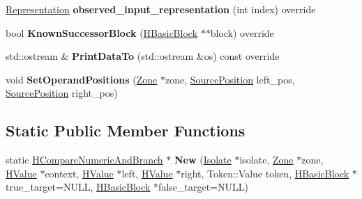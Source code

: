 \begin{DoxyCompactItemize}
\item 
\hyperlink{classv8_1_1internal_1_1_representation}{Representation} {\bfseries observed\+\_\+input\+\_\+representation} (int index) override\hypertarget{classv8_1_1internal_1_1_h_compare_numeric_and_branch_a8b893e5a1b233e9f026cb100224024e4}{}\label{classv8_1_1internal_1_1_h_compare_numeric_and_branch_a8b893e5a1b233e9f026cb100224024e4}

\item 
bool {\bfseries Known\+Successor\+Block} (\hyperlink{classv8_1_1internal_1_1_h_basic_block}{H\+Basic\+Block} $\ast$$\ast$block) override\hypertarget{classv8_1_1internal_1_1_h_compare_numeric_and_branch_ab9db3e27127b397429d1ca6a176110ed}{}\label{classv8_1_1internal_1_1_h_compare_numeric_and_branch_ab9db3e27127b397429d1ca6a176110ed}

\item 
std\+::ostream \& {\bfseries Print\+Data\+To} (std\+::ostream \&os) const  override\hypertarget{classv8_1_1internal_1_1_h_compare_numeric_and_branch_a68c059d7840c6149d7e1a0a085a3bfa6}{}\label{classv8_1_1internal_1_1_h_compare_numeric_and_branch_a68c059d7840c6149d7e1a0a085a3bfa6}

\item 
void {\bfseries Set\+Operand\+Positions} (\hyperlink{classv8_1_1internal_1_1_zone}{Zone} $\ast$zone, \hyperlink{classv8_1_1internal_1_1_source_position}{Source\+Position} left\+\_\+pos, \hyperlink{classv8_1_1internal_1_1_source_position}{Source\+Position} right\+\_\+pos)\hypertarget{classv8_1_1internal_1_1_h_compare_numeric_and_branch_a55fe883b91af5314cc1b4f90724c5fa6}{}\label{classv8_1_1internal_1_1_h_compare_numeric_and_branch_a55fe883b91af5314cc1b4f90724c5fa6}

\end{DoxyCompactItemize}
\subsection*{Static Public Member Functions}
\begin{DoxyCompactItemize}
\item 
static \hyperlink{classv8_1_1internal_1_1_h_compare_numeric_and_branch}{H\+Compare\+Numeric\+And\+Branch} $\ast$ {\bfseries New} (\hyperlink{classv8_1_1internal_1_1_isolate}{Isolate} $\ast$isolate, \hyperlink{classv8_1_1internal_1_1_zone}{Zone} $\ast$zone, \hyperlink{classv8_1_1internal_1_1_h_value}{H\+Value} $\ast$context, \hyperlink{classv8_1_1internal_1_1_h_value}{H\+Value} $\ast$left, \hyperlink{classv8_1_1internal_1_1_h_value}{H\+Value} $\ast$right, Token\+::\+Value token, \hyperlink{classv8_1_1internal_1_1_h_basic_block}{H\+Basic\+Block} $\ast$true\+\_\+target=N\+U\+LL, \hyperlink{classv8_1_1internal_1_1_h_basic_block}{H\+Basic\+Block} $\ast$false\+\_\+target=N\+U\+LL)\hypertarget{classv8_1_1internal_1_1_h_compare_numeric_and_branch_a74394ee81d1000f6729c7e804a2688fb}{}\label{classv8_1_1internal_1_1_h_compare_numeric_and_branch_a74394ee81d1000f6729c7e804a2688fb}

\end{DoxyCompactItemize}
